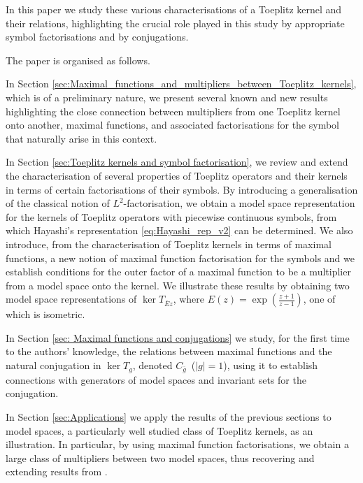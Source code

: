 \documentclass[12pt]{elsarticle}
\numberwithin{equation}{section}
\theoremstyle{plain}
\newcommand{\Cg}{\ensuremath{C_{\ol g}}}
\newcommand{\ol}[1]{\ensuremath{\overline{#1}}}
\begin{document}
\vspace{8pt}

In this paper we study these various characterisations of a Toeplitz kernel and their relations, highlighting the crucial role played in this study by appropriate symbol factorisations and by conjugations.


The paper is organised as follows.

In Section \ref{sec:Maximal_functions_and_multipliers_between_Toeplitz_kernels}, which is of a preliminary nature, we present several known and new results highlighting the close connection between multipliers from one Toeplitz kernel onto another, maximal functions, and associated factorisations for the symbol that naturally arise in this context.


In Section \ref{sec:Toeplitz kernels and symbol factorisation}, we review and extend the characterisation of several properties of Toeplitz operators and their kernels in terms of certain factorisations of their symbols.
By introducing a generalisation of the classical notion of $L^2$-factorisation, we obtain a model space representation for the kernels of Toeplitz operators with piecewise continuous symbols, from which Hayashi's representation \eqref{eq:Hayashi_rep_v2} can be determined.
We also introduce, from the characterisation of Toeplitz kernels in terms of maximal functions, a new notion of maximal function factorisation for the symbols and we establish conditions for the outer factor of a maximal function to be a multiplier from a model space onto the kernel.
We illustrate these results by obtaining two model space representations of $\ker T_{\ol E z}$, where $E(z) = \exp (\frac{z+1}{z-1} )$, one of which is isometric.



In Section \ref{sec: Maximal functions and conjugations} we study, for the first time to the authors' knowledge, the relations between maximal functions and the natural conjugation in $\ker T_g$, denoted \Cg\ ($|g|=1$), using it to establish connections with generators of model spaces and invariant sets for the conjugation.


In Section \ref{sec:Applications} we apply the results of the previous sections to model spaces, a particularly well studied class of Toeplitz kernels, as an illustration.
In particular, by using maximal function factorisations, we obtain a large class of multipliers between two model spaces, thus recovering and extending results from \cite{Cro94}.
\end{document}
